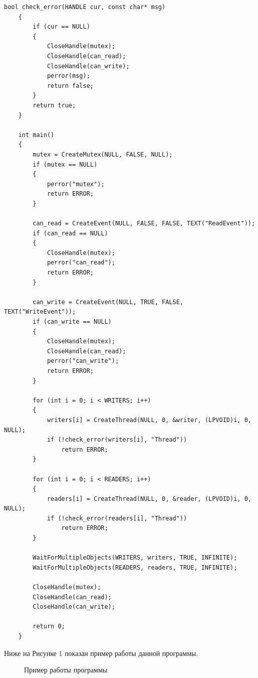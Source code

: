 \documentclass[14pt, a4paper]{extarticle}
\begin{document}
\begin{lstlisting}[caption= Задание]
	bool check_error(HANDLE cur, const char* msg)
	{
		if (cur == NULL)
		{
			CloseHandle(mutex);
			CloseHandle(can_read);
			CloseHandle(can_write);
			perror(msg);
			return false;
		}
		return true;
	}
	
	int main()
	{
		mutex = CreateMutex(NULL, FALSE, NULL);
		if (mutex == NULL)
		{
			perror("mutex");
			return ERROR;
		}
		
		can_read = CreateEvent(NULL, FALSE, FALSE, TEXT("ReadEvent"));
		if (can_read == NULL)
		{
			CloseHandle(mutex);
			perror("can_read");
			return ERROR;
		}
		
		can_write = CreateEvent(NULL, TRUE, FALSE, TEXT("WriteEvent"));
		if (can_write == NULL)
		{
			CloseHandle(mutex);
			CloseHandle(can_read);
			perror("can_write");
			return ERROR;
		}
		
		for (int i = 0; i < WRITERS; i++)
		{
			writers[i] = CreateThread(NULL, 0, &writer, (LPVOID)i, 0, NULL);
			if (!check_error(writers[i], "Thread"))
				return ERROR;
		}
		
		for (int i = 0; i < READERS; i++)
		{
			readers[i] = CreateThread(NULL, 0, &reader, (LPVOID)i, 0, NULL);
			if (!check_error(readers[i], "Thread"))
				return ERROR;
		}
		
		WaitForMultipleObjects(WRITERS, writers, TRUE, INFINITE);
		WaitForMultipleObjects(READERS, readers, TRUE, INFINITE);
		
		CloseHandle(mutex);
		CloseHandle(can_read);
		CloseHandle(can_write);
		
		return 0;
	}
	\end{lstlisting}
	
	\newpage
	Ниже на Рисунке 1 показан пример работы данной программы.
	\begin{figure}[h!]
		\caption{Пример работы программы}
	\end{figure}
	\newpage
\end{document}
